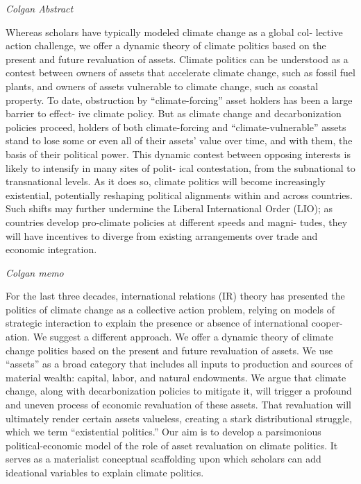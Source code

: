 \documentclass[
]{book}
\begin{document}
\emph{Colgan Abstract}

Whereas scholars have typically modeled climate change as a global col-
lective action challenge, we offer a dynamic theory of climate politics based on the
present and future revaluation of assets. Climate politics can be understood as a
contest between owners of assets that accelerate climate change, such as fossil fuel
plants, and owners of assets vulnerable to climate change, such as coastal property.
To date, obstruction by ``climate-forcing'' asset holders has been a large barrier to effect-
ive climate policy. But as climate change and decarbonization policies proceed, holders
of both climate-forcing and ``climate-vulnerable'' assets stand to lose some or even all of
their assets' value over time, and with them, the basis of their political power. This
dynamic contest between opposing interests is likely to intensify in many sites of polit-
ical contestation, from the subnational to transnational levels. As it does so, climate
politics will become increasingly existential, potentially reshaping political alignments
within and across countries. Such shifts may further undermine the Liberal International
Order (LIO); as countries develop pro-climate policies at different speeds and magni-
tudes, they will have incentives to diverge from existing arrangements over trade and
economic integration.

\emph{Colgan memo}

For the last three decades, international relations (IR) theory has presented the
politics of climate change as a collective action problem, relying on models of
strategic interaction to explain the presence or absence of international cooper-
ation. We suggest a different approach. We offer a dynamic theory of climate
change politics based on the present and future revaluation of assets. We use
``assets'' as a broad category that includes all inputs to production and sources of
material wealth: capital, labor, and natural endowments. We argue that climate
change, along with decarbonization policies to mitigate it, will trigger a profound
and uneven process of economic revaluation of these assets. That revaluation will
ultimately render certain assets valueless, creating a stark distributional struggle,
which we term ``existential politics.'' Our aim is to develop a parsimonious
political-economic model of the role of asset revaluation on climate politics. It
serves as a materialist conceptual scaffolding upon which scholars can add ideational
variables to explain climate politics.
\end{document}
